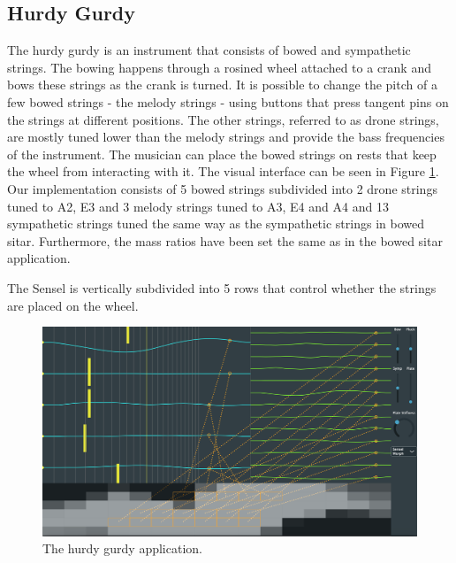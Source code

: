 \documentclass{article}
\begin{document}
\subsection{Hurdy Gurdy}
The hurdy gurdy is an instrument that consists of bowed and sympathetic strings. The bowing happens through a rosined wheel attached to a crank and bows these strings as the crank is turned. It is possible to change the pitch of a few bowed strings - the melody strings - using buttons that press tangent pins on the strings at different positions. The other strings, referred to as drone strings, are mostly tuned lower than the melody strings and provide the bass frequencies of the instrument. The musician can place the bowed strings on rests that keep the wheel from interacting with it. 
The visual interface can be seen in Figure \ref{fig:hurdyGurdy}.
Our implementation consists of 5 bowed strings subdivided into 2 drone strings tuned to A2, E3 and 3 melody strings tuned to A3, E4 and A4 and 13 sympathetic strings tuned the same way as the sympathetic strings in bowed sitar. Furthermore, the mass ratios have been set the same as in the bowed sitar application.

The Sensel is vertically subdivided into 5 rows that control whether the strings are placed on the wheel. 

\begin{figure}[h]
\centering
\includegraphics[width=1.0\columnwidth]{HurdyGurdy.png}
\caption{The hurdy gurdy application. \label{fig:hurdyGurdy}}
\end{figure}


\end{document}
